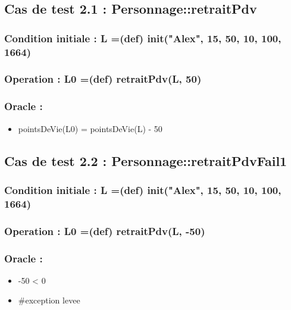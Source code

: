 \documentclass[11pt]{article}
\begin{document}
\subsection{Cas de test 2.1 : Personnage::retraitPdv}
\label{sec-1.5}

\subsubsection{Condition initiale :  L =(def) init("Alex", 15, 50, 10, 100, 1664)}
\label{sec-1.5.1}

\subsubsection{Operation : L0 =(def) retraitPdv(L, 50)}
\label{sec-1.5.2}

\subsubsection{Oracle :}
\label{sec-1.5.3}

\begin{itemize}

\item pointsDeVie(L0) = pointsDeVie(L) - 50\\
\label{sec-1.5.3.1}


\end{itemize} %
\subsection{Cas de test 2.2 : Personnage::retraitPdvFail1}
\label{sec-1.6}

\subsubsection{Condition initiale :  L =(def) init("Alex", 15, 50, 10, 100, 1664)}
\label{sec-1.6.1}

\subsubsection{Operation : L0 =(def) retraitPdv(L, -50)}
\label{sec-1.6.2}

\subsubsection{Oracle :}
\label{sec-1.6.3}

\begin{itemize}

\item -50 < 0\\
\label{sec-1.6.3.1}


\item \#exception levee\\
\label{sec-1.6.3.2}





\end{itemize} %
\end{document}
